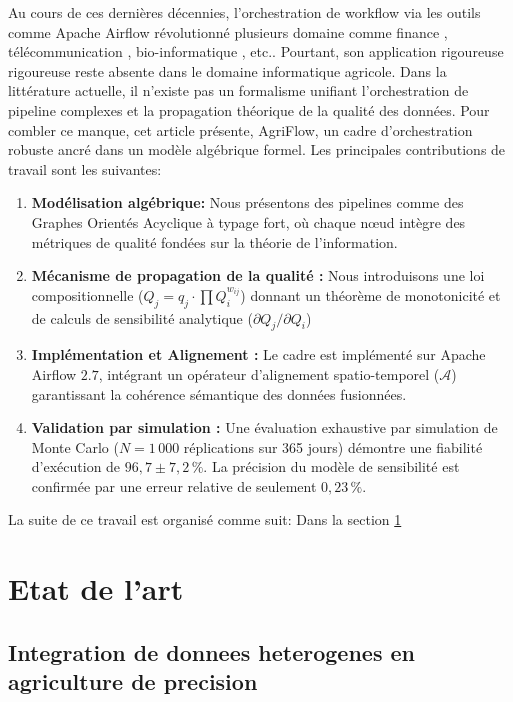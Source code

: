 \documentclass[12pt]{article}
\begin{document}
Au cours de ces dernières décennies, l'orchestration de workflow via les outils comme Apache Airflow  révolutionné plusieurs domaine comme finance \cite{}, télécommunication \cite{}, bio-informatique \cite{},  etc.. Pourtant, son application rigoureuse rigoureuse reste absente dans le  domaine informatique agricole. Dans la littérature actuelle, il n'existe pas un formalisme unifiant l'orchestration de pipeline complexes et la propagation théorique de la qualité des données.  Pour combler ce manque, cet article présente, AgriFlow, un cadre d'orchestration robuste ancré dans un modèle algébrique formel. Les principales contributions de travail sont les suivantes:
\begin{enumerate}
	\item \textbf{Modélisation algébrique:} Nous présentons des pipelines comme des Graphes Orientés Acyclique à typage fort, où chaque n\oe ud intègre des métriques de qualité fondées
	sur la théorie de l’information.
	\item \textbf{Mécanisme de propagation de la qualité :} Nous introduisons une loi compositionnelle ($Q_j = q_j \cdot \prod Q_i^{w_{ij}}$) donnant un théorème de monotonicité et de calculs de sensibilité analytique  ($\partial Q_j / \partial Q_i$)
	\item \textbf{Implémentation et Alignement :} Le cadre est implémenté sur Apache Airflow
	$2.7$, intégrant un opérateur d’alignement spatio-temporel ($\mathcal{A}$) garantissant la cohérence 	sémantique des données fusionnées.
	\item \textbf{Validation par simulation :} Une évaluation exhaustive par simulation de Monte Carlo ($N=1\,000$ réplications sur 365 jours) démontre une fiabilité d'exécution de $96,7 \pm 7,2\,\%$. La précision du modèle de sensibilité est confirmée par une erreur relative de seulement $0,23\,\%$.
	
\end{enumerate}
La suite de ce travail est organisé comme suit: Dans la section \ref{sect2}

\section{Etat de l'art}\label{sect2} 
\label{sec:related}

\subsection{Integration de donnees heterogenes en agriculture de precision}
\end{document}

